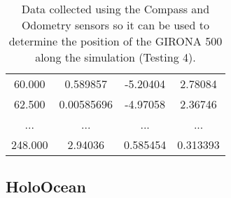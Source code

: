 \documentclass[]{article}
\begin{document}
\begin{table}[H]
\begin{center}
\begin{tabular}{cccc}
			\footnotesize 60.000 & \footnotesize 0.589857 & \footnotesize -5.20404 & \footnotesize 2.78084 \\
			
			\footnotesize 62.500 & \footnotesize 0.00585696 & \footnotesize -4.97058 & \footnotesize 2.36746 \\
			
			
			
			\footnotesize ... & \footnotesize ... &\footnotesize ... & \footnotesize ... \\
			
			\footnotesize 248.000	& \footnotesize 2.94036 & \footnotesize 0.585454 & \footnotesize 0.313393  \\
			
			
			
			
			
			\bottomrule\end{tabular}
		\caption{Data collected using the Compass and Odometry sensors so it can be used to determine the position of the GIRONA 500 along the simulation (Testing 4).}
	\end{center}
\end{table}

\newpage

\subsection{HoloOcean}

\end{document}
